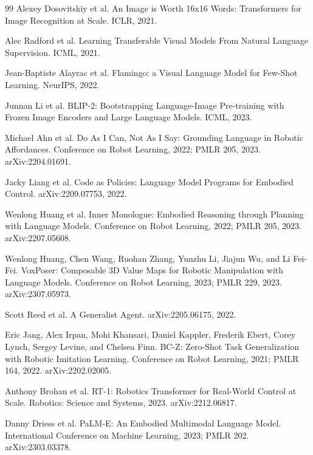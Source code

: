 \documentclass[11pt,oneside,openany]{oblivoir}
\numberwithin{section}{chapter}
\numberwithin{subsection}{section}
\numberwithin{equation}{chapter}
\begin{document}
\begin{thebibliography}{99}
Alexey Dosovitskiy et al.
\newblock An Image is Worth 16x16 Words: Transformers for Image Recognition at Scale.
\newblock ICLR, 2021.

Alec Radford et al.
\newblock Learning Transferable Visual Models From Natural Language Supervision.
\newblock ICML, 2021.

Jean-Baptiste Alayrac et al.
\newblock Flamingo: a Visual Language Model for Few-Shot Learning.
\newblock NeurIPS, 2022.

Junnan Li et al.
\newblock BLIP-2: Bootstrapping Language-Image Pre-training with Frozen Image Encoders and Large Language Models.
\newblock ICML, 2023.

Michael Ahn et al.
\newblock Do As I Can, Not As I Say: Grounding Language in Robotic Affordances.
\newblock Conference on Robot Learning, 2022; PMLR 205, 2023. arXiv:2204.01691.

Jacky Liang et al.
\newblock Code as Policies: Language Model Programs for Embodied Control.
\newblock arXiv:2209.07753, 2022.

Wenlong Huang et al.
\newblock Inner Monologue: Embodied Reasoning through Planning with Language Models.
\newblock Conference on Robot Learning, 2022; PMLR 205, 2023. arXiv:2207.05608.

Wenlong Huang, Chen Wang, Ruohan Zhang, Yunzhu Li, Jiajun Wu, and Li Fei-Fei.
\newblock VoxPoser: Composable 3D Value Maps for Robotic Manipulation with Language Models.
\newblock Conference on Robot Learning, 2023; PMLR 229, 2023. arXiv:2307.05973.

Scott Reed et al.
\newblock A Generalist Agent.
\newblock arXiv:2205.06175, 2022.

Eric Jang, Alex Irpan, Mohi Khansari, Daniel Kappler, Frederik Ebert,
Corey Lynch, Sergey Levine, and Chelsea Finn.
\newblock BC-Z: Zero-Shot Task Generalization with Robotic Imitation Learning.
\newblock Conference on Robot Learning, 2021; PMLR 164, 2022. arXiv:2202.02005.

Anthony Brohan et al.
\newblock RT-1: Robotics Transformer for Real-World Control at Scale.
\newblock Robotics: Science and Systems, 2023. arXiv:2212.06817.

Danny Driess et al.
\newblock PaLM-E: An Embodied Multimodal Language Model.
\newblock International Conference on Machine Learning, 2023; PMLR 202. arXiv:2303.03378.


\end{thebibliography}
\end{document}
